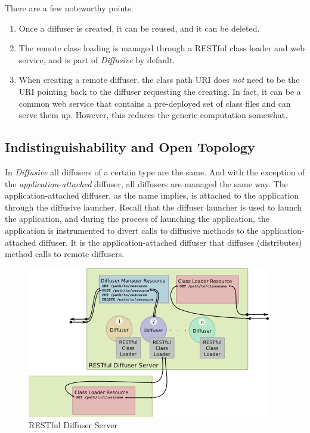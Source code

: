 \documentclass[11pt]{scrartcl}
\begin{document}
There are a few noteworthy points. 
\begin{enumerate}
\item Once a diffuser is created, it can be reused, and it can be deleted.
\item The remote class loading is managed through a RESTful class loader and web service, and is part of \emph{Diffusive} by default.
\item When creating a remote diffuser, the class path URI does \emph{not} need to be the URI pointing back to the diffuser requesting the creating. In fact, it can be a common web service that contains a pre-deployed set of class files and can serve them up. However, this reduces the generic computation somewhat.
\end{enumerate}

\subsection{Indistinguishability and Open Topology\label{sec:indistinguishability_and_open_topology}}
In \emph{Diffusive} all diffusers of a certain type are the same. And with the exception of the \emph{application-attached} diffuser, all diffusers are managed the same way. The application-attached diffuser, as the name implies, is attached to the application through the diffusive launcher. Recall that the diffuser launcher is used to launch the application, and during the process of launching the application, the application is instrumented to divert calls to diffusive methods to the application-attached diffuser. It is the application-attached diffuser that diffuses (distributes) method calls to remote diffusers.

\begin{figure}[htbp]
\begin{center}
\includegraphics[scale=1.1]{restful_diffuser_server}
\caption{RESTful Diffuser Server}
\label{fig:restful_diffuser_server}
\end{center}
\end{figure}
\end{document}
